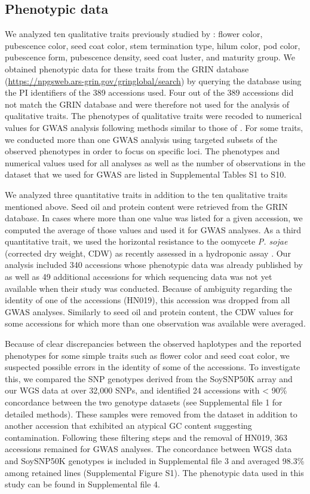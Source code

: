 \documentclass{article}
\begin{document}
\subsection*{Phenotypic data}

We analyzed ten qualitative traits previously studied by : flower
color, pubescence color, seed coat color, stem termination type, hilum color,
pod color, pubescence form, pubescence density, seed coat luster, and maturity
group.  We obtained phenotypic data for these traits from the GRIN database
(\url{https://npgsweb.ars-grin.gov/gringlobal/search}) by querying the database
using the PI identifiers of the 389 accessions used.  Four out of the 389
accessions did not match the GRIN database and were therefore not used for the
analysis of qualitative traits. The phenotypes of qualitative traits were recoded
to numerical values for GWAS analysis following methods similar to those of
.  For some traits, we conducted more than one GWAS analysis
using targeted subsets of the observed phenotypes in order to focus on specific
loci. The phenotypes and numerical values used for all analyses as well as the
number of observations in the dataset that we used for GWAS are listed in
Supplemental Tables S1 to S10.

We analyzed three quantitative traits in addition to the ten qualitative traits
mentioned above. Seed oil and protein content were retrieved from the GRIN
database. In cases where more than one value was listed for a given accession,
we computed the average of those values and used it for GWAS analyses. As a third quantitative trait, we
used the horizontal resistance to the oomycete \textit{P. sojae} (corrected dry
weight, CDW) as recently assessed in a hydroponic assay .
Our analysis included 340 accessions whose phenotypic data
was already published by  as well as 49 additional accessions for
which sequencing data was not yet available when their study was conducted.
Because of ambiguity regarding the identity of one of the accessions (HN019), this accession
was dropped from all GWAS analyses. Similarly to seed oil and
protein content, the CDW values for some accessions for which more than one
observation was available were averaged.

Because of clear discrepancies between the observed haplotypes and the reported
phenotypes for some simple traits such as flower color and seed coat color, we
suspected possible errors in the identity of some of the accessions. To
investigate this, we compared the SNP genotypes derived from the SoySNP50K
array and our WGS data at over 32,000 SNPs, and identified 24 accessions with <
90\% concordance between the two genotype datasets (see Supplemental file 1 for
detailed methods). These samples were removed from the dataset in addition to another
accession that exhibited an atypical GC content suggesting contamination.
Following these filtering steps and the removal of HN019, 363 accessions
remained for GWAS analyses. The concordance between WGS data and SoySNP50K
genotypes is included in Supplemental file 3 and averaged 98.3\% among retained
lines (Supplemental Figure S1). The phenotypic data used in this study can be found in Supplemental file 4.
\end{document}
